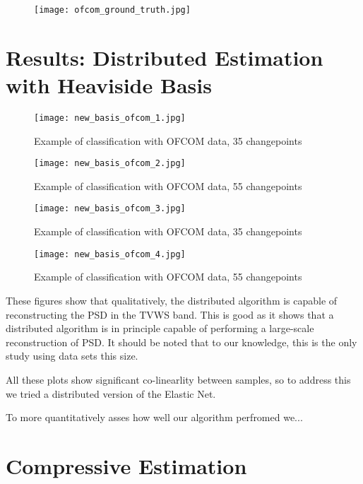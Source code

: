 \begin{figure}[h]
\centering
\texttt{[image: ofcom\_ground\_truth.jpg]}
\caption{}
\label{fig:hvb}
\end{figure}


\section{Results: Distributed Estimation with Heaviside Basis}

\begin{figure}[h]
\centering
\texttt{[image: new\_basis\_ofcom\_1.jpg]}
\caption{Example of classification with OFCOM data, 35 changepoints}
\label{fig:hvb}
\end{figure}

\begin{figure}[h]
\centering
\texttt{[image: new\_basis\_ofcom\_2.jpg]}
\caption{Example of classification with OFCOM data, 55 changepoints}
\label{fig:hvb}
\end{figure}

\begin{figure}[h]
\centering
\texttt{[image: new\_basis\_ofcom\_3.jpg]}
\caption{Example of classification with OFCOM data, 35 changepoints}
\label{fig:hvb}
\end{figure}

\begin{figure}[h]
\centering
\texttt{[image: new\_basis\_ofcom\_4.jpg]}
\caption{Example of classification with OFCOM data, 55 changepoints}
\label{fig:hvb}
\end{figure}

These figures show that qualitatively, the distributed algorithm is capable of reconstructing the PSD in the TVWS band. This is good as it shows that a distributed algorithm is in principle capable of performing a large-scale reconstruction of PSD. It should be noted that to our knowledge, this is the only study using data sets this size. 

All these plots show significant co-linearlity between samples, so to address this we tried a distributed version of the Elastic Net. 

To more quantitatively asses how well our algorithm perfromed we...

\section{Compressive Estimation}

